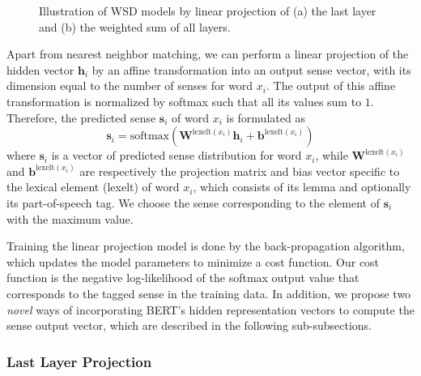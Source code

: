\documentclass[11pt,a4paper]{article}
\begin{document}
\begin{figure*}
\caption{\label{fig:linear} Illustration of WSD models by linear projection of (a) the last layer and (b) the weighted sum of all layers.}
\end{figure*}

Apart from nearest neighbor matching, we can perform a linear projection of the hidden vector $\mathbf{h}_i$ by an affine transformation into an output sense vector, with its dimension equal to the number of senses for word $x_i$. The output of this affine transformation is normalized by softmax such that all its values sum to $1$. Therefore, the predicted sense $\mathbf{s}_i$ of word $x_i$ is formulated as
\begin{equation}
\label{eq:linear}
\mathbf{s}_i = \text{softmax}(\mathbf{W}^{\text{lexelt}(x_i)}\mathbf{h}_i + \mathbf{b}^{\text{lexelt}(x_i)})
\end{equation}
where $\mathbf{s}_i$ is a vector of predicted sense distribution for word $x_i$, while $\mathbf{W}^{\text{lexelt}(x_i)}$ and $\mathbf{b}^{\text{lexelt}(x_i)}$ are respectively the projection matrix and bias vector specific to the lexical element (lexelt) of word $x_i$, which consists of its lemma and optionally its part-of-speech tag. We choose the sense corresponding to the element of $\mathbf{s}_i$ with the maximum value.

Training the linear projection model is done by the back-propagation algorithm, which updates the model parameters to minimize a cost function. Our cost function is the negative log-likelihood of the softmax output value that corresponds to the tagged sense in the training data. In addition, we propose two {\it novel} ways of incorporating BERT's hidden representation vectors to compute the sense output vector, which are described in the following sub-subsections.

\subsubsection{Last Layer Projection}
\label{sec:incorporating_linear_last}
\end{document}
